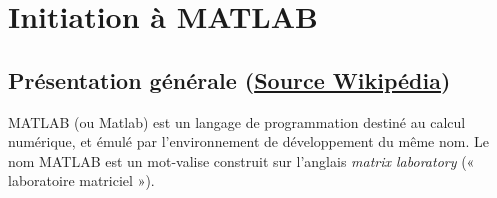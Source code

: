 \chapter{Initiation à MATLAB\label{annexe-matlab}}

\captionsetup{width=0.9\linewidth}
\section[Présentation générale]
        {Présentation générale 
        (\href{https://fr.wikipedia.org/wiki/MATLAB}{Source Wikipédia})}
MATLAB (ou Matlab) est un langage de programmation destiné au calcul numérique, 
et émulé par l'environnement de développement du même nom. 
Le nom MATLAB est un mot-valise construit sur l'anglais \emph{matrix 
laboratory} (« laboratoire matriciel »).

